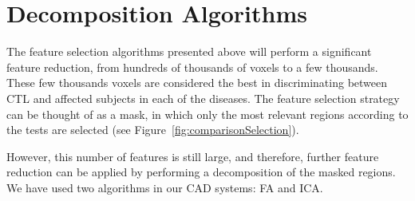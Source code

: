 \section{Decomposition Algorithms}
The feature selection algorithms presented above will perform a significant feature reduction, from hundreds of thousands of voxels to a few thousands. These few thousands voxels are considered the best in discriminating between \ac{CTL} and affected subjects in each of the diseases. The feature selection strategy can be thought of as a mask, in which only the most relevant regions according to the tests are selected (see Figure~\ref{fig:comparisonSelection}). 

However, this number of features is still large, and therefore, further feature reduction can be applied by performing a decomposition of the masked regions. We have used two algorithms in our \ac{CAD} systems: \acf{FA} and \acf{ICA}.

